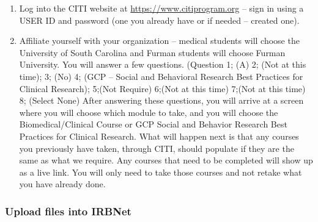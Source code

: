 \documentclass[
]{book}
\providecommand{\tightlist}{%
  \setlength{\itemsep}{0pt}\setlength{\parskip}{0pt}}
\begin{document}
\begin{enumerate}
\def\labelenumi{\arabic{enumi}.}
\tightlist
\item
  Log into the CITI website at \url{https://www.citiprogram.org} -- sign in using a USER ID and password (one you already have or if needed -- created one).
\item
  Affiliate yourself with your organization -- medical students will choose the University of South Carolina and Furman students will choose Furman University. You will answer a few questions. (Question 1; (A) 2; (Not at this time); 3; (No) 4; (GCP -- Social and Behavioral Research Best Practices for Clinical Research); 5;(Not Require) 6;(Not at this time) 7;(Not at this time) 8; (Select None)
  After answering these questions, you will arrive at a screen where you will choose which module to take, and you will choose the Biomedical/Clinical Course or GCP Social and Behavior Research Best Practices for Clinical Research. What will happen next is that any courses you previously have taken, through CITI, should populate if they are the same as what we require. Any courses that need to be completed will show up as a live link. You will only need to take those courses and not retake what you have already done.
\end{enumerate}

\hypertarget{IRBNetCertificates}{%
\subsubsection{Upload files into IRBNet}\label{IRBNetCertificates}}
\end{document}

